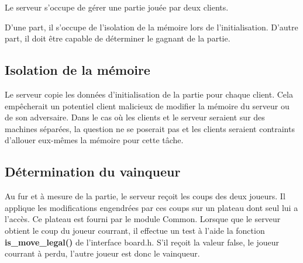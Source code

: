 Le serveur s'occupe de gérer une partie jouée par deux clients. 

D'une part, il s'occupe de l'isolation de la mémoire lors de l'initialisation.
D'autre part, il doit être capable de déterminer le gagnant de la partie.


\subsection{Isolation de la mémoire}
Le serveur copie les données d'initialisation de la partie pour chaque client.
Cela empêcherait un potentiel client malicieux de modifier la mémoire du serveur ou 
de son adversaire.
Dans le cas où les clients et le serveur seraient sur des machines séparées, 
la question ne se poserait pas et les clients seraient contraints
d'allouer eux-mêmes la mémoire pour cette tâche.

\subsection{Détermination du vainqueur}
Au fur et à mesure de la partie, le serveur reçoit les coups des deux joueurs.
Il applique les modifications engendrées par ces coups sur un plateau dont seul lui a l'accès.
Ce plateau est fourni par le module Common. Lorsque que le serveur obtient le coup 
du joueur courrant, il effectue un test à l'aide la fonction \textbf{is\_move\_legal()} de l'interface board.h.
S'il reçoit la valeur false, le joueur courrant à perdu, l'autre joueur est donc le vainqueur.